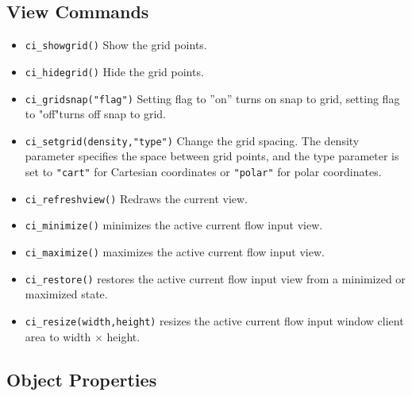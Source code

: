 \subsection{View Commands}
\begin{itemize}
\item \texttt{ci\_showgrid()} Show the grid points.

\item \texttt{ci\_hidegrid()} Hide the grid points.

\item \texttt{ci\_gridsnap("flag")} Setting flag to ''on'' turns on snap to grid,
setting flag to "off"turns off snap to grid.

\item \texttt{ci\_setgrid(density,"type")} Change the grid spacing. The density
parameter specifies the space between grid points, and the type
parameter is set to \texttt{"cart"} for Cartesian coordinates or
\texttt{"polar"} for polar coordinates.

\item \texttt{ci\_refreshview()} Redraws the current view.

\item{\tt ci\_minimize()} minimizes the active current flow input view.

\item{\tt ci\_maximize()} maximizes the active current flow input view.

\item{\tt ci\_restore()} restores the active current flow input view from a
 minimized or maximized state.

\item{\tt ci\_resize(width,height)} resizes the active current flow input
 window client area to width $\times$ height.

\end{itemize}




\subsection{Object Properties}

